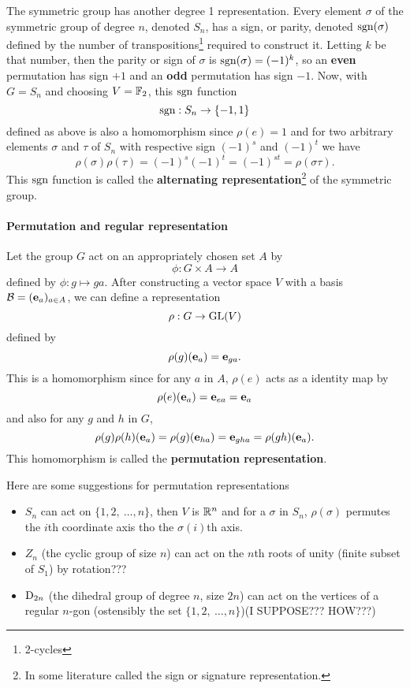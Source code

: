 	The symmetric group has another degree 1 representation. Every element $\sigma$ of the symmetric group of degree $n$, denoted $S_n$, has a sign, or parity, denoted $\text{sgn}(\sigma)$ defined by the number of transpositions\footnote{2-cycles} required to construct it. Letting $k$ be that number, then the parity or sign of $\sigma$ is $\text{sgn}(\sigma)=(-1)^k$, so an \textbf{even} permutation has sign $+1$ and an \textbf{odd} permutation has sign $-1$. Now, with $G = S_n$ and choosing $V=\mathbb{F}_2$, this $\text{sgn}$ function
	\[
		\text{sgn}: S_n \rightarrow \{-1, 1\}
	\]
	defined as above is also a homomorphism since $\rho(e) = 1$ and for two arbitrary elements $\sigma$ and $\tau$ of $S_n$ with respective sign $(-1)^s$ and $(-1)^t$ we have 
	\[
		\rho(\sigma)\rho(\tau) = (-1)^s(-1)^t = (-1)^{st} = \rho(\sigma\tau).
	\] 
	This $\text{sgn}$ function is called the \textbf{alternating representation}\footnote{In some literature called the sign or signature representation.} of the symmetric group.
	
	\paragraph{Permutation and regular representation}
	
	Let the group $G$ act on an appropriately chosen set $A$ by
	\[
		\phi : G \times A \rightarrow A
	\] %
	defined by $\phi: g \mapsto ga$. After constructing a vector space $V$ with a basis $\mathcal{B} = ( \mathbf{e}_a )_{a \in A}$, we can define a representation
	\[
		\rho: G \rightarrow \text{GL}(V)
	\]
	defined by
	\[
		\rho(g)(\mathbf{e}_a) = \mathbf{e}_{ga}.
	\]
	This is a homomorphism since for any $a$ in $A$, $\rho(e)$ acts as a identity map by 
	\[
		\rho(e)(\mathbf{e}_a) = \mathbf{e}_{ea} = \mathbf{e}_a
	\]
	and also for any $g$ and $h$ in $G$, 
	\[
		\rho(g)\rho(h)(\mathbf{e}_a) = \rho(g)(\mathbf{e}_{ha}) = \mathbf{e}_{gha} = \rho(gh)(\mathbf{e}_a).
	\]
	This homomorphism is called the \textbf{permutation representation}.
	
	\begin{example}
		Here are some suggestions for permutation representations
		\begin{itemize}
			\item $S_n$ can act on $\{1,2,\ \dots, n\}$, then $V$ is $\mathbb{R}^n$ and for a $\sigma$ in $S_n$, $\rho(\sigma)$ permutes the $i$th coordinate axis tho the $\sigma(i)$th axis.
			\item $Z_n$ (the cyclic group of size $n$) can act on the $n$th roots of unity (finite subset of $S_1$) by rotation???
			\item $\text{D}_{2n}$ (the dihedral group of degree $n$, size $2n$) can act on the vertices of a regular $n$-gon (ostensibly the set $\{1, 2, \ \dots, n\}$)(I SUPPOSE??? HOW???)
		\end{itemize}
	\end{example}
	

